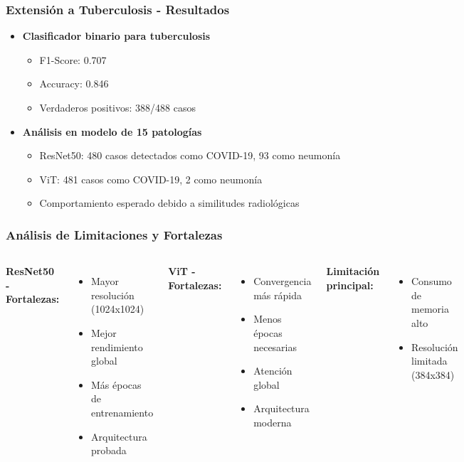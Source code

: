 \begin{frame}
\frametitle{Extensión a Tuberculosis - Resultados}
\begin{itemize}
    \item \textbf{Clasificador binario para tuberculosis}
    \begin{itemize}
        \item F1-Score: 0.707
        \item Accuracy: 0.846
        \item Verdaderos positivos: 388/488 casos
    \end{itemize}
    \item \textbf{Análisis en modelo de 15 patologías}
    \begin{itemize}
        \item ResNet50: 480 casos detectados como COVID-19, 93 como neumonía
        \item ViT: 481 casos como COVID-19, 2 como neumonía
        \item Comportamiento esperado debido a similitudes radiológicas
    \end{itemize}
\end{itemize}
\end{frame}

\begin{frame}
\frametitle{Análisis de Limitaciones y Fortalezas}
\begin{columns}
\textbf{ResNet50 - Fortalezas:}
\begin{itemize}
    \item Mayor resolución (1024x1024)
    \item Mejor rendimiento global
    \item Más épocas de entrenamiento
    \item Arquitectura probada
\end{itemize}

\textbf{ViT - Fortalezas:}
\begin{itemize}
    \item Convergencia más rápida
    \item Menos épocas necesarias
    \item Atención global
    \item Arquitectura moderna
\end{itemize}

\textbf{Limitación principal:}
\begin{itemize}
    \item Consumo de memoria alto
    \item Resolución limitada (384x384)
\end{itemize}
\end{columns}
\end{frame}

